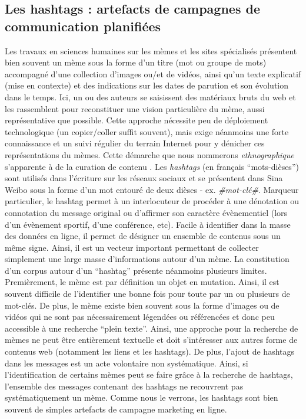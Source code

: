 \subsection[Les hashtags ne sont pas des mèmes]{Les hashtags : artefacts de campagnes de communication planifiées}
\label{sec:hashtags}
Les travaux en sciences humaines sur les mèmes \citep{Bauckhage2011, Coscia2013, Knobel2007} et les sites spécialisés \citep{Buchel2012, Bernstein2011} présentent bien souvent un mème sous la forme d{\textquoteright}un titre (mot ou groupe de mots) accompagné d{\textquoteright}une collection d{\textquoteright}images ou/et de vidéos, ainsi qu{\textquoteright}un texte explicatif (mise en contexte) et des indications sur les dates de parution et son évolution dans le temps. Ici, un ou des auteurs se saisissent des matériaux bruts du web et les rassemblent pour reconstituer une vision particulière du mème, aussi représentative que possible. Cette approche nécessite peu de déploiement technologique (un copier/coller suffit souvent), mais exige néanmoins une forte connaissance et un suivi régulier du terrain Internet pour y dénicher ces représentations du mèmes. Cette démarche que nous nommerons \textit{ethnographique }s{\textquoteright}apparente à de la curation de contenu \citep{Buckingham2006}. Les \textit{hashtags }(en fran\c{c}ais {\textquotedblleft}mots-dièses{\textquotedblright}) sont utilisés dans l{\textquoteright}écriture sur les réseaux sociaux et se présentent dans Sina Weibo sous la forme d{\textquoteright}un mot entouré de deux dièses - ex. \textit{\#mot-clé\#}. Marqueur particulier, le hashtag permet à un interlocuteur de procéder à une dénotation ou connotation du message original \citep{Romero2011} ou d{\textquoteright}affirmer son caractère évènementiel (lors d{\textquoteright}un évènement sportif, d{\textquoteright}une conférence, etc). Facile à identifier dans la masse des données en ligne, il permet de désigner un ensemble de contenus sous un m\^eme signe. Ainsi, il est un vecteur important permettant de collecter simplement une large masse d{\textquoteright}informations autour d{\textquoteright}un mème. La constitution d{\textquoteright}un corpus autour d{\textquoteright}un {\textquotedblleft}hashtag{\textquotedblright} présente néanmoins plusieurs limites. Premièrement, le mème est par définition un objet en mutation. Ainsi, il est souvent difficile de l{\textquoteright}identifier une bonne fois pour toute par un ou plusieurs de mot-clés. De plus, le mème existe bien souvent sous la forme d{\textquoteright}images ou de vidéos qui ne sont pas nécessairement légendées ou référencées et donc peu accessible à une recherche {\textquotedblleft}plein texte{\textquotedblright}. Ainsi, une approche pour la recherche de mèmes ne peut \^etre entièrement textuelle et doit s{\textquoteright}intéresser aux autres forme de contenus web (notamment les liens et les hashtags). De plus, l{\textquoteright}ajout de hashtags dans les messages est un acte volontaire non systématique. Ainsi, si l{\textquoteright}identification de certains mèmes peut se faire gr\^ace à la recherche de hashtags, l{\textquoteright}ensemble des messages contenant des hashtags ne recouvrent pas systématiquement un mème. Comme nous le verrons, les hashtags sont bien souvent de simples artefacts de campagne marketing en ligne.

